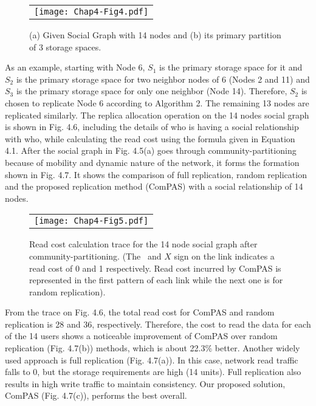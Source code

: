 \begin{figure}[h]
\begin{center}
  \begin{tabular}{c}
  \texttt{[image: Chap4-Fig4.pdf]}
  \end{tabular}
  \caption{(a) Given Social Graph with 14 nodes and (b) its primary partition of 3 storage spaces.}
\end{center}
\end{figure}

As an example, starting with Node 6, $S_1$ is the primary storage space for it and $S_2$ is the primary storage space for two neighbor nodes of 6 (Nodes 2 and 11) and $S_3$ is the primary storage space for only one neighbor (Node 14). Therefore, $S_2$ is chosen to replicate Node 6 according to Algorithm 2.  The remaining 13 nodes are replicated similarly. The replica allocation operation on the 14 nodes social graph is shown in Fig. 4.6, including the details of who is having a social relationship with who, while calculating the read cost using the formula given in Equation 4.1. After the social graph in Fig. 4.5(a) goes through community-partitioning because of mobility and dynamic nature of the network, it forms the formation shown in Fig. 4.7. It shows the comparison of full replication, random replication and the proposed replication method (ComPAS) with a social relationship of 14 nodes.

\begin{figure}[!t]
\begin{center}
  \begin{tabular}{c}
  \texttt{[image: Chap4-Fig5.pdf]}
  \end{tabular}
  \caption{Read cost calculation trace for the 14 node social graph after community-partitioning. (The \checkmark~and $X$ sign on the link indicates a read cost of 0 and 1 respectively. Read cost incurred by ComPAS is represented in the first pattern of each link while the next one is for random replication).}
\end{center}
\end{figure}


From the trace on Fig. 4.6, the total read cost for ComPAS and random replication is 28 and 36, respectively. Therefore, the cost to read the data for each of the 14 users shows a noticeable improvement of ComPAS over random replication (Fig. 4.7(b)) methods, which is about 22.3\% better. Another widely used approach is full replication (Fig. 4.7(a)). In this case, network read traffic falls to 0, but the storage requirements are high (14 units). Full replication also results in high write traffic to maintain consistency. Our proposed solution, ComPAS (Fig. 4.7(c)), performs the best overall.

